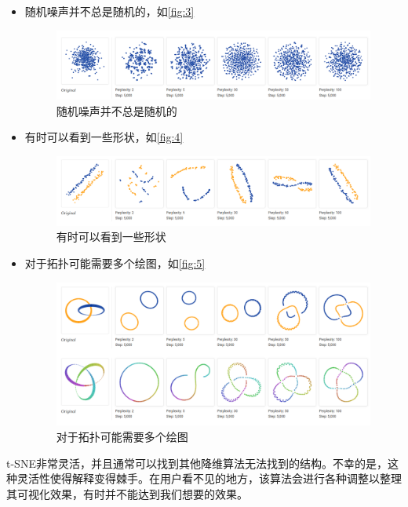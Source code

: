 \documentclass[12pt,hyperref,a4paper,UTF8]{ctexart}
\begin{document}
{{\begin{itemize}
\item 随机噪声并不总是随机的，如\autoref{fig:3}
\begin{figure}
\centering
\includegraphics[width=.8\linewidth]{pic/3.png}
\caption{随机噪声并不总是随机的}
\label{fig:3}
\end{figure}

\item 有时可以看到一些形状，如\autoref{fig:4}
\begin{figure}
\centering
\includegraphics[width=.8\linewidth]{pic/4.png}
\caption{有时可以看到一些形状}
\label{fig:4}
\end{figure}

\item 对于拓扑可能需要多个绘图，如\autoref{fig:5}
\begin{figure}
\centering
\includegraphics[width=.8\linewidth]{pic/5.png}
\caption{对于拓扑可能需要多个绘图}
\label{fig:5}
\end{figure}
\end{itemize}
\par

t-SNE非常灵活，并且通常可以找到其他降维算法无法找到的结构。不幸的是，这种灵活性使得解释变得棘手。在用户看不见的地方，该算法会进行各种调整以整理其可视化效果，有时并不能达到我们想要的效果。
	
	

}}
\end{document}
